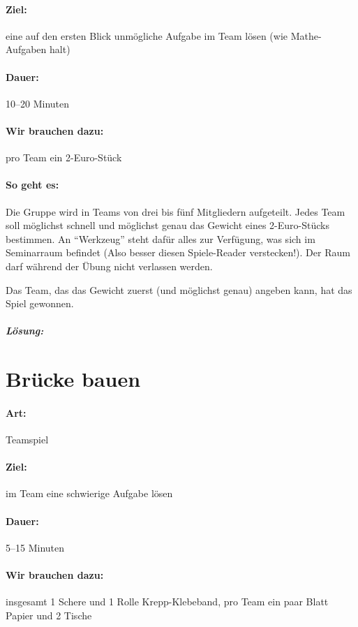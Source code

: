 \paragraph{Ziel:} eine auf den ersten Blick unmögliche Aufgabe im Team lösen (wie Mathe-Aufgaben halt)
\paragraph{Dauer:} 10--20 Minuten
\paragraph{Wir brauchen dazu:} pro Team ein 2-Euro-Stück
\paragraph{So geht es:} Die Gruppe wird in Teams von drei bis fünf Mitgliedern aufgeteilt. Jedes Team soll möglichst schnell und möglichst genau das Gewicht eines 2-Euro-Stücks bestimmen. An "`Werkzeug"' steht dafür alles zur Verfügung, was sich im Seminarraum befindet (Also besser diesen Spiele-Reader verstecken!). Der Raum darf während der Übung nicht verlassen werden.

Das Team, das das Gewicht zuerst (und möglichst genau) angeben kann, hat das Spiel gewonnen.

\subparagraph{Lösung:}

\section{Brücke bauen}
\paragraph{Art:} Teamspiel
\paragraph{Ziel:} im Team eine schwierige Aufgabe lösen
\paragraph{Dauer:} 5--15 Minuten
\paragraph{Wir brauchen dazu:} insgesamt 1 Schere und 1 Rolle Krepp-Klebeband, pro Team ein paar Blatt Papier und 2 Tische
